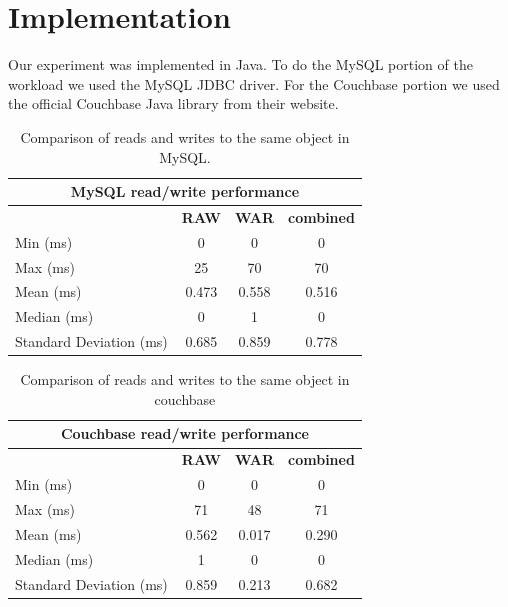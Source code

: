 \documentclass[10pt, conference, compsocconf]{IEEEtran}
\begin{document}
\section{Implementation}\label{sec:implementation}
Our experiment was implemented in Java. To do the MySQL portion of
the workload we used the MySQL JDBC driver. For the Couchbase portion we used
the official Couchbase Java library from their website.

\begin{table}[t]
   \centering
      \begin{tabular}{| l | c | c | c |}
         \hline
            \multicolumn{4}{|c|}{{\textbf{MySQL read/write performance}}} \\
         \hline
            & \textbf{RAW} & \textbf{WAR} & \textbf{combined} \\
         \hline
            Min (ms) & 0 & 0 & 0 \\
         \hline
            Max (ms) & 25 & 70 & 70 \\
         \hline
            Mean (ms) & 0.473 & 0.558 & 0.516 \\
         \hline
            Median (ms) & 0 & 1 & 0 \\
         \hline
            Standard Deviation (ms) & 0.685 & 0.859 & 0.778 \\
         \hline
      \end{tabular}
      \caption{Comparison of reads and writes to the same object in MySQL.}
      \label{tab:sql_perf}
\end{table}

\begin{table}[t]
   \centering
      \begin{tabular}{| l | c | c | c |}
         \hline
            \multicolumn{4}{|c|}{{\textbf{Couchbase read/write performance}}} \\
         \hline
            & \textbf{RAW} & \textbf{WAR} & \textbf{combined} \\
         \hline
            Min (ms) & 0 & 0 & 0 \\
         \hline
            Max (ms) & 71 & 48 & 71 \\
         \hline
            Mean (ms) & 0.562 & 0.017 & 0.290 \\
         \hline
            Median (ms) & 1 & 0 & 0 \\
         \hline
            Standard Deviation (ms) & 0.859 & 0.213 & 0.682 \\
         \hline
      \end{tabular}
      \caption{Comparison of reads and writes to the same object in couchbase}
      \label{tab:couch_perf}
\end{table}
\end{document}
